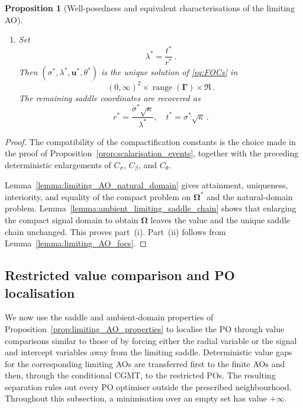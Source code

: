 \documentclass{article}
\newtheorem{proposition}[theorem]{Proposition}
\theoremstyle{definition}
\newcommand*{\bb}{\boldsymbol}
\def\bu{\bb{u}}
\newcommand{\range}{\operatorname{range}}
\begin{document}
\begin{bibunit}
\begin{proposition}[Well-posedness and equivalent characterisations of the limiting AO]
\begin{enumerate}[label=(\roman*)]
    \item
    Set
    $$
        \lambda^*
        =
        \frac{t^*}{r^*} \,.
    $$
    Then $(\sigma^*,\lambda^*,\bu^*,\theta^*)$ is the unique solution of
    \eqref{eq:FOCs} in
    $$
        (0,\infty)^2
        \times
        \range(\bb\Gamma)
        \times
        \Re \,.
    $$
    The remaining saddle coordinates are recovered as
    $$
        r^*
        =
        \frac{\sigma^*\sqrt\kappa}{\lambda^*},
        \quad
        t^*
        =
        \sigma^*\sqrt\kappa \,.
    $$
\end{enumerate}
\end{proposition}

\begin{proof}
The compatibility of the compactification constants is the choice made in
the proof of Proposition~\ref{prop:scalarisation_events}, together with the
preceding deterministic enlargements of $C_\sigma$, $C_\beta$, and
$C_\theta$.

Lemma~\ref{lemma:limiting_AO_natural_domain} gives attainment, uniqueness,
interiority, and equality of the compact problem on $\bb\Omega^*$ and the
natural-domain problem. Lemma~\ref{lemma:ambient_limiting_saddle_chain}
shows that enlarging the compact signal domain to obtain $\bb\Omega$ leaves
the value and the unique saddle chain unchanged. This proves part~(i).
Part~(ii) follows from Lemma~\ref{lemma:limiting_AO_focs}.
\end{proof}


\subsection{Restricted value comparison and PO localisation}
\label{sec:cgmt-cost-comparisons}
We now use the saddle and ambient-domain properties of
Proposition~\ref{prop:limiting_AO_properties} to localise the PO through
value comparisons similar to those of \citet{thrampoulidis+etal:2018} by forcing either
the radial variable or the signal and intercept variables away from the
limiting saddle. Deterministic value gaps for the corresponding limiting
AOs are transferred first to the finite AOs and then, through the
conditional CGMT, to the restricted POs. The resulting separation rules
out every PO optimiser outside the prescribed neighbourhood. Throughout
this subsection, a minimisation over an empty set has value $+\infty$.


\end{bibunit}
\end{document}
